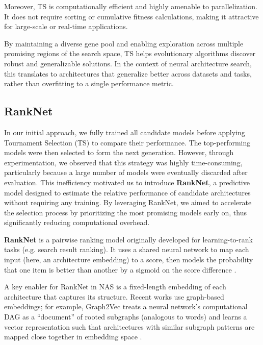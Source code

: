 Moreover, TS is computationally efficient and highly amenable to parallelization. It does not require sorting or cumulative fitness calculations, making it attractive for large-scale or real-time applications.

By maintaining a diverse gene pool and enabling exploration across multiple promising regions of the search space, TS helps evolutionary algorithms discover robust and generalizable solutions. In the context of neural architecture search, this translates to architectures that generalize better across datasets and tasks, rather than overfitting to a single performance metric.





\subsection{RankNet}

In our initial approach, we fully trained all candidate models before applying Tournament Selection (TS) to compare their performance. The top-performing models were then selected to form the next generation. However, through experimentation, we observed that this strategy was highly time-consuming, particularly because a large number of models were eventually discarded after evaluation. This inefficiency motivated us to introduce \textbf{RankNet}, a predictive model designed to estimate the relative performance of candidate architectures without requiring any training. By leveraging RankNet, we aimed to accelerate the selection process by prioritizing the most promising models early on, thus significantly reducing computational overhead.

\textbf{RankNet} is a pairwise ranking model originally developed for learning-to-rank tasks (e.g. search result ranking). It uses a shared neural network to map each input (here, an architecture embedding) to a score, then models the probability that one item is better than another by a sigmoid on the score difference \cite{RankNet}.

A key enabler for RankNet in NAS is a fixed-length embedding of each architecture that captures its structure. Recent works use graph-based embeddings; for example, Graph2Vec treats a neural network’s computational DAG as a “document” of rooted subgraphs (analogous to words) and learns a vector representation such that architectures with similar subgraph patterns are mapped close together in embedding space \cite{RankNet}.


